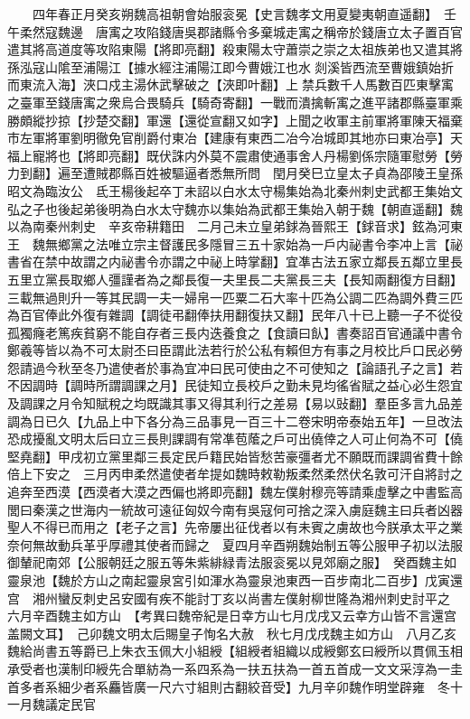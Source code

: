 　　四年春正月癸亥朔魏高祖朝會始服衮冕【史言魏孝文用夏變夷朝直遥翻】　壬午柔然寇魏邊　唐㝢之攻陷錢唐吳郡諸縣令多棄城走㝢之稱帝於錢唐立太子置百官遣其將高道度等攻陷東陽【將即亮翻】殺東陽太守蕭崇之崇之太祖族弟也又遣其將孫泓寇山隂至浦陽江【據水經注浦陽江即今曹娥江也水剡溪皆西流至曹娥鎮始折而東流入海】浹口戍主湯休武擊破之【浹即叶翻】上禁兵數千人馬數百匹東擊㝢之臺軍至錢唐㝢之衆烏合畏騎兵【騎奇寄翻】一戰而潰擒斬㝢之進平諸郡縣臺軍乘勝頗縱抄掠【抄楚交翻】軍還【還從宣翻又如字】上聞之收軍主前軍將軍陳天福棄市左軍將軍劉明徹免官削爵付東冶【建康有東西二冶今冶城即其地亦曰東冶亭】天福上寵將也【將即亮翻】既伏誅内外莫不震肅使通事舍人丹楊劉係宗隨軍慰勞【勞力到翻】遍至遭賊郡縣百姓被驅逼者悉無所問　閏月癸巳立皇太子貞為邵陵王皇孫昭文為臨汝公　氐王楊後起卒丁未詔以白水太守楊集始為北秦州刺史武都王集始文弘之子也後起弟後明為白水太守魏亦以集始為武都王集始入朝于魏【朝直遥翻】魏以為南秦州刺史　辛亥帝耕籍田　二月己未立皇弟銶為晉熙王【銶音求】鉉為河東王　魏無鄉黨之法唯立宗主督護民多隱冒三五十家始為一戶内祕書令李冲上言【祕書省在禁中故謂之内祕書令亦謂之中祕上時掌翻】宜凖古法五家立鄰長五鄰立里長五里立黨長取鄉人彊謹者為之鄰長復一夫里長二夫黨長三夫【長知兩翻復方目翻】三載無過則升一等其民調一夫一婦帛一匹粟二石大率十匹為公調二匹為調外費三匹為百官俸此外復有雜調【調徒弔翻俸扶用翻復扶又翻】民年八十已上聽一子不從役孤獨癃老篤疾貧窮不能自存者三長内迭養食之【食讀曰飤】書奏詔百官通議中書令鄭羲等皆以為不可太尉丕曰臣謂此法若行於公私有賴但方有事之月校比戶口民必勞怨請過今秋至冬乃遣使者於事為宜冲曰民可使由之不可使知之【論語孔子之言】若不因調時【調時所謂調課之月】民徒知立長校戶之勤未見均徭省賦之益心必生怨宜及調課之月令知賦稅之均既識其事又得其利行之差易【易以䜴翻】羣臣多言九品差調為日已久【九品上中下各分為三品事見一百三十二卷宋明帝泰始五年】一旦改法恐成擾亂文明太后曰立三長則課調有常凖苞䕃之戶可出僥倖之人可止何為不可【僥堅堯翻】甲戌初立黨里鄰三長定民戶籍民始皆愁苦豪彊者尤不願既而課調省費十餘倍上下安之　三月丙申柔然遣使者牟提如魏時敕勒叛柔然柔然伏名敦可汗自將討之追奔至西漠【西漠者大漠之西偏也將即亮翻】魏左僕射穆亮等請乘虛擊之中書監高閭曰秦漢之世海内一統故可遠征匈奴今南有吳寇何可捨之深入虜庭魏主曰兵者凶器聖人不得已而用之【老子之言】先帝屢出征伐者以有未賓之虜故也今朕承太平之業奈何無故動兵革乎厚禮其使者而歸之　夏四月辛酉朔魏始制五等公服甲子初以法服御輦祀南郊【公服朝廷之服五等朱紫緋緑青法服衮冕以見郊廟之服】　癸酉魏主如靈泉池【魏於方山之南起靈泉宮引如渾水為靈泉池東西一百步南北二百步】戊寅還宫　湘州蠻反刺史呂安國有疾不能討丁亥以尚書左僕射柳世隆為湘州刺史討平之　六月辛酉魏主如方山　【考異曰魏帝紀是日幸方山七月戊戌又云幸方山皆不言還宫盖闕文耳】　己卯魏文明太后賜皇子恂名大赦　秋七月戊戌魏主如方山　八月乙亥魏給尚書五等爵已上朱衣玉佩大小組綬【組綬者組織以成綬鄭玄曰綬所以貫佩玉相承受者也漢制印綬先合單紡為一系四系為一扶五扶為一首五首成一文文采淳為一圭首多者系細少者系麤皆廣一尺六寸組則古翻絞音受】九月辛卯魏作明堂辟雍　冬十一月魏議定民官

